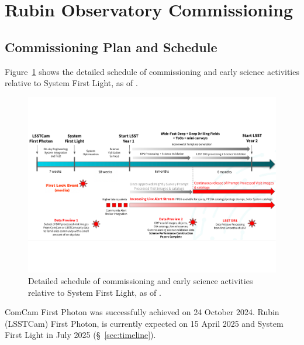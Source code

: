 \section{Rubin Observatory Commissioning}
\label{sec:commissioning}

\subsection{Commissioning Plan and Schedule}
\label{ssec:commissioning-schedule}

Figure~\ref{fig:commissioning-es-schedule} shows the detailed schedule of commissioning and early science activities relative to System First Light, as of \currentdate.
\begin{figure}[htb]
\centering
\includegraphics[width=0.98\linewidth]{figures/rubinobs_on-sky_commissioning_and_early_science.pdf}
\caption{Detailed schedule of commissioning  and early science activities relative to System First Light, as of \currentdate.}
\label{fig:commissioning-es-schedule}
\vspace{0.1cm}
\end{figure}
ComCam First Photon was successfully achieved on 24 October 2024.
Rubin (LSSTCam) First Photon, is currently expected on 15 April 2025 and System First Light in  July 2025 (\S~\ref{sec:timeline}). 

